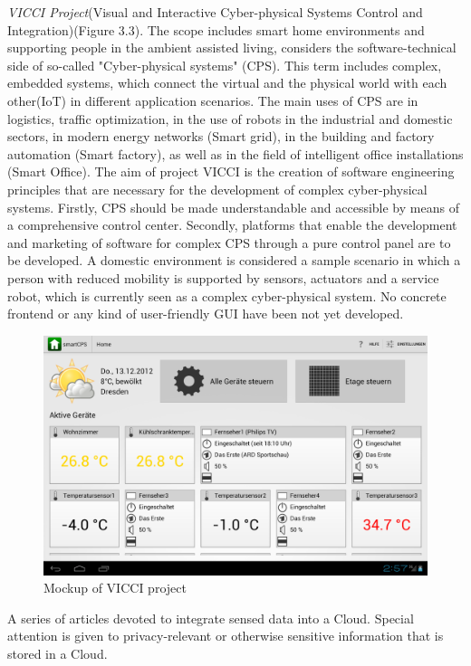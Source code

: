     \emph{VICCI Project}(Visual and Interactive Cyber-physical Systems Control and Integration)\cite{vicci,6548811}(Figure 3.3). The scope includes smart home environments and supporting people in the ambient assisted living, considers the software-technical side of so-called "Cyber-physical systems" (CPS). This term includes complex, embedded systems, which connect the virtual and the physical world with each other(IoT) in different application scenarios. The main uses of CPS are in logistics, traffic optimization, in the use of robots in the industrial and domestic sectors, in modern energy networks (Smart grid), in the building and factory automation (Smart factory), as well as in the field of intelligent office installations (Smart Office). The aim of project VICCI is the creation of software engineering principles that are necessary for the development of complex cyber-physical systems. Firstly, CPS should be made understandable and accessible by means of a comprehensive control center. Secondly, platforms that enable the development and marketing of software for complex CPS through a pure control panel are to be developed. A domestic environment is considered a sample scenario in which a person with reduced mobility is supported by sensors, actuators and a service robot, which is currently seen as a complex cyber-physical system. No concrete frontend or any kind of user-friendly GUI have been not yet developed.
     \begin{figure}[!ht]
		\centering
		\includegraphics[scale=0.4]{Material/examples/VICCI.png}   
		\caption[Mockup of VICCI project]{Mockup of VICCI project}                  
		\end{figure} 

	A series of articles devoted to integrate sensed data into a Cloud. Special attention is given to privacy-relevant or otherwise sensitive information that is stored in a Cloud. 

